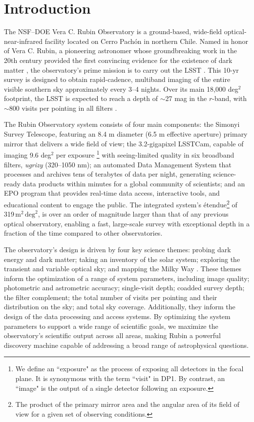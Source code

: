 \section{Introduction}
\label{sec:intro}
The \gls{NSF}--\gls{DOE} Vera C. Rubin Observatory is a ground-based, wide-field optical-near-infrared facility located on Cerro Pach\'on in northern Chile.
Named in honor of Vera C. Rubin, a pioneering astronomer whose groundbreaking work in the 20th century provided the first convincing evidence for the existence of dark matter \citep[][]{1970ApJ...159..379R, 1980ApJ...238..471R}, the observatory’s prime mission is to carry out the \gls{LSST} \citep[][]{2019ApJ...873..111I}.
This 10-yr survey is designed to obtain rapid-cadence, multiband imaging of the entire visible southern sky approximately every 3--4 nights. 
Over its main 18,000 deg$^2$ footprint, the LSST is expected to reach a depth of $\sim$27 mag in the $r$-band, with $\sim$800 visits per pointing in all filters \citep[][]{2022ApJS..258....1B}.

The Rubin Observatory system consists of four main components: the \gls{Simonyi Survey Telescope}, featuring an 8.4 m diameter (6.5 m effective aperture) primary mirror that delivers a wide field of view; the 3.2-gigapixel \gls{LSSTCam}, capable of imaging 9.6 deg$^2$ per exposure
\footnote{We define an ``exposure" as the process of exposing all  detectors in the focal plane. It is synonymous with the term ``visit" in 	DP1. By contrast, an ``image" is the output of a single detector following an exposure.} 
with seeing-limited quality in six broadband filters, \textit{ugrizy} (320--1050 nm); an automated \gls{Data Management System} that processes and archives tens of terabytes of data per night, generating science-ready data products within minutes for a global community of scientists; and an \gls{EPO} program that provides real-time data access, interactive tools, and educational content to engage the public.
The integrated system's \'etendue\footnote{The product of the primary mirror area and the angular area of its field of view for a given set of observing conditions.} of 319\,$\text{m}^2\,\text{deg}^2$, is over an order of magnitude larger than that of any previous optical observatory, enabling a fast, large-scale survey with exceptional depth in a fraction of the time compared to other observatories.

The observatory's design is driven by four key science themes: probing dark energy and dark matter; taking an inventory of the solar system; exploring the transient and variable optical sky; and mapping the Milky Way \citep[][]{2019ApJ...873..111I}.
These themes inform the optimization of a range of system parameters, including image quality; photometric and astrometric accuracy; single-visit depth; coadded survey depth; the filter complement; the total number of visits per pointing and their distribution on the sky; and total sky coverage.
Additionally, they inform the design of the data processing and access systems.
By optimizing the system parameters to support a wide range of scientific goals, we maximize the observatory's scientific output across all areas, making Rubin a powerful discovery machine capable of addressing a broad range of astrophysical questions.

